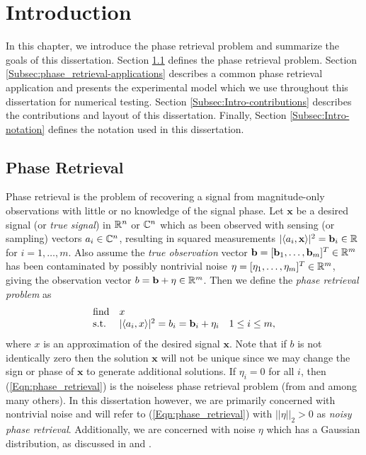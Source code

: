 \chapter{Introduction}  \label{Sec:Intro}


In this chapter, we introduce the phase retrieval problem and summarize the goals of this dissertation.
Section \ref{Subsec:phase_retrieval-math_model} defines the phase retrieval problem.
Section \ref{Subsec:phase_retrieval-applications} describes a common phase retrieval application and presents the experimental model which we use throughout this dissertation for numerical testing.
Section \ref{Subsec:Intro-contributions} describes the contributions and layout of this dissertation.
Finally, Section \ref{Subsec:Intro-notation} defines the notation used in this dissertation.


\section{Phase Retrieval}	\label{Subsec:phase_retrieval-math_model}



Phase retrieval is the problem of recovering a signal from magnitude-only observations with little or no knowledge of the signal phase.  
Let $\mathbf{x}$ be a desired signal (or \textit{true signal}) in ${\mathbb R}^n$ or ${\mathbb C}^n$ which as been observed with sensing (or sampling) vectors $a_i \in {\mathbb C}^n$, resulting in squared measurements $|\langle a_i, \mathbf{x} \rangle |^2 = \mathbf{b}_i \in {\mathbb R}$ for $i = 1, \ldots, m$.
Also assume the \textit{true observation} vector $\mathbf{b} = [\mathbf{b}_1, \ldots, \mathbf{b}_m]^T \in {\mathbb R}^m$ has been contaminated by possibly nontrivial noise $\eta = [\eta_1, \ldots, \eta_m]^T \in {\mathbb R}^m$, giving the observation vector $b = \mathbf{b} + \eta \in {\mathbb R}^m$.  Then we define the \textit{phase retrieval problem} as
\begin{equation} \label{Eqn:phase_retrieval}
\begin{array}{lll}
\textnormal{find}		&	x		\\
\textnormal{s.t.}				&	|\langle a_i, x \rangle|^2 = b_i = \mathbf{b}_i + \eta_i	&	1 \leq i \leq m,
\end{array}
\end{equation}
where $x$ is an approximation of the desired signal $\textbf{x}$.  
Note that if $b$ is not identically zero then the solution $\textbf{x}$ will not be unique since we may change the sign or phase of $\textbf{x}$ to generate additional solutions.
If $\eta_i = 0$ for all $i$, then (\ref{Eqn:phase_retrieval}) is the noiseless phase retrieval problem (from \cite{Fienup82} and  \cite{DBLP:journals/tit/CandesLS15} among many others).  In this dissertation however, we are primarily concerned with nontrivial noise and will refer to (\ref{Eqn:phase_retrieval}) with $||\eta||_2 > 0$ as \textit{noisy phase retrieval}.  Additionally, we are concerned with noise $\eta$ which has a Gaussian distribution, as discussed in \cite{DBLP:journals/siamis/CandesESV13} and \cite{DBLP:journals/siamsc/FriedlanderM16}.


